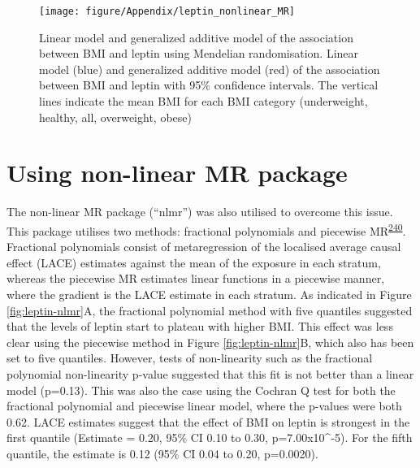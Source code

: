 \documentclass[11pt,twoside]{bristolthesis}
\begin{document}
\begin{figure}

{\centering \texttt{[image: figure/Appendix/leptin\_nonlinear\_MR]} 

}

\caption[Linear model and generalized additive model of the association between BMI and leptin using Mendelian randomisation]{Linear model and generalized additive model of the association between BMI and leptin using Mendelian randomisation. Linear model (blue) and generalized additive model (red) of the association between BMI and leptin with 95\% confidence intervals. The vertical lines indicate the mean BMI for each BMI category (underweight, healthy, all, overweight, obese)}\label{fig:leptin-lm-GAM-MR}
\end{figure}
\hypertarget{using-non-linear-mr-package}{%
\section{Using non-linear MR package}\label{using-non-linear-mr-package}}

The non-linear MR package (``nlmr'') was also utilised to overcome this issue. This package utilises two methods: fractional polynomials and piecewise MR\textsuperscript{\protect\hyperlink{ref-Staley2017}{240}}. Fractional polynomials consist of metaregression of the localised average causal effect (LACE) estimates against the mean of the exposure in each stratum, whereas the piecewise MR estimates linear functions in a piecewise manner, where the gradient is the LACE estimate in each stratum. As indicated in Figure \ref{fig:leptin-nlmr}A, the fractional polynomial method with five quantiles suggested that the levels of leptin start to plateau with higher BMI. This effect was less clear using the piecewise method in Figure \ref{fig:leptin-nlmr}B, which also has been set to five quantiles. However, tests of non-linearity such as the fractional polynomial non-linearity p-value suggested that this fit is not better than a linear model (p=0.13). This was also the case using the Cochran Q test for both the fractional polynomial and piecewise linear model, where the p-values were both 0.62. LACE estimates suggest that the effect of BMI on leptin is strongest in the first quantile (Estimate = 0.20, 95\% CI 0.10 to 0.30, p=7.00x10\^{}-5). For the fifth quantile, the estimate is 0.12 (95\% CI 0.04 to 0.20, p=0.0020).
\end{document}
